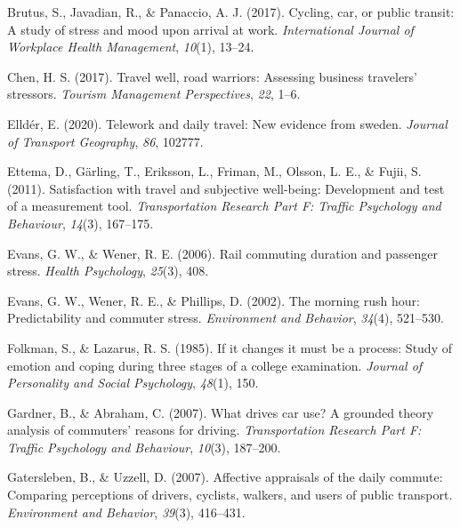 \documentclass[
11pt, %
oneside, %
english, %
singlespacing, %
]{macthesis} %
\newlength{\cslhangindent}
\newenvironment{CSLReferences}[2] %
 {%
  \setlength{\parindent}{0pt}
  \ifodd #1 \everypar{\setlength{\hangindent}{\cslhangindent}}\ignorespaces\fi
  \ifnum #2 > 0
  \setlength{\parskip}{#2\baselineskip}
  \fi
 }%
 {}
\begin{document}
\begin{CSLReferences}{1}{0}
\leavevmode{}%
Brutus, S., Javadian, R., \& Panaccio, A. J. (2017). Cycling, car, or public transit: A study of stress and mood upon arrival at work. \emph{International Journal of Workplace Health Management}, \emph{10}(1), 13--24.

\leavevmode{}%
Chen, H. S. (2017). Travel well, road warriors: Assessing business travelers' stressors. \emph{Tourism Management Perspectives}, \emph{22}, 1--6.

\leavevmode{}%
Elldér, E. (2020). Telework and daily travel: New evidence from sweden. \emph{Journal of Transport Geography}, \emph{86}, 102777.

\leavevmode{}%
Ettema, D., Gärling, T., Eriksson, L., Friman, M., Olsson, L. E., \& Fujii, S. (2011). Satisfaction with travel and subjective well-being: Development and test of a measurement tool. \emph{Transportation Research Part F: Traffic Psychology and Behaviour}, \emph{14}(3), 167--175.

\leavevmode{}%
Evans, G. W., \& Wener, R. E. (2006). Rail commuting duration and passenger stress. \emph{Health Psychology}, \emph{25}(3), 408.

\leavevmode{}%
Evans, G. W., Wener, R. E., \& Phillips, D. (2002). The morning rush hour: Predictability and commuter stress. \emph{Environment and Behavior}, \emph{34}(4), 521--530.

\leavevmode{}%
Folkman, S., \& Lazarus, R. S. (1985). If it changes it must be a process: Study of emotion and coping during three stages of a college examination. \emph{Journal of Personality and Social Psychology}, \emph{48}(1), 150.

\leavevmode{}%
Gardner, B., \& Abraham, C. (2007). What drives car use? A grounded theory analysis of commuters' reasons for driving. \emph{Transportation Research Part F: Traffic Psychology and Behaviour}, \emph{10}(3), 187--200.

\leavevmode{}%
Gatersleben, B., \& Uzzell, D. (2007). Affective appraisals of the daily commute: Comparing perceptions of drivers, cyclists, walkers, and users of public transport. \emph{Environment and Behavior}, \emph{39}(3), 416--431.


\end{CSLReferences}
\end{document}
